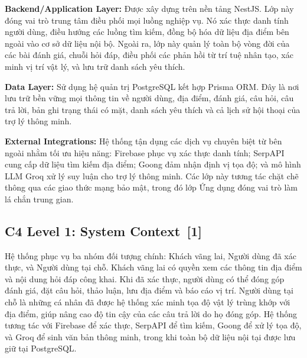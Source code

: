 \documentclass[12pt, a4paper]{article}
\begin{document}
\textbf{Backend/Application Layer:}
Được xây dựng trên nền tảng NestJS. Lớp này đóng vai trò trung tâm điều phối mọi luồng nghiệp vụ. Nó xác thực danh tính người dùng, điều hướng các luồng tìm kiếm, đồng bộ hóa dữ liệu địa điểm bên ngoài vào cơ sở dữ liệu nội bộ. Ngoài ra, lớp này quản lý toàn bộ vòng đời của các bài đánh giá, chuỗi hỏi đáp, điều phối các phản hồi từ trí tuệ nhân tạo, xác minh vị trí vật lý, và lưu trữ danh sách yêu thích.

\textbf{Data Layer:}
Sử dụng hệ quản trị PostgreSQL kết hợp Prisma ORM. Đây là nơi lưu trữ bền vững mọi thông tin về người dùng, địa điểm, đánh giá, câu hỏi, câu trả lời, bản ghi trạng thái có mặt, danh sách yêu thích và cả lịch sử hội thoại của trợ lý thông minh.

\textbf{External Integrations:}
Hệ thống tận dụng các dịch vụ chuyên biệt từ bên ngoài nhằm tối ưu hiệu năng: Firebase phục vụ xác thực danh tính; SerpAPI cung cấp dữ liệu tìm kiếm địa điểm; Goong đảm nhận định vị tọa độ; và mô hình LLM Groq xử lý suy luận cho trợ lý thông minh. Các lớp này tương tác chặt chẽ thông qua các giao thức mạng bảo mật, trong đó lớp Ứng dụng đóng vai trò làm lá chắn trung gian.

\subsection[C4 Level 1: System Context]{C4 Level 1: System Context \,{\normalfont\small\textcolor{cyan!70!black}{[1]}}}
Hệ thống phục vụ ba nhóm đối tượng chính: Khách vãng lai, Người dùng đã xác thực, và Người dùng tại chỗ. Khách vãng lai có quyền xem các thông tin địa điểm và nội dung hỏi đáp công khai. Khi đã xác thực, người dùng có thể đóng góp đánh giá, đặt câu hỏi, thảo luận, lưu địa điểm và báo cáo vị trí. Người dùng tại chỗ là những cá nhân đã được hệ thống xác minh tọa độ vật lý trùng khớp với địa điểm, giúp nâng cao độ tin cậy của các câu trả lời do họ đóng góp. Hệ thống tương tác với Firebase để xác thực, SerpAPI để tìm kiếm, Goong để xử lý tọa độ, và Groq để sinh văn bản thông minh, trong khi toàn bộ dữ liệu nội tại được lưu giữ tại PostgreSQL.
\end{document}
